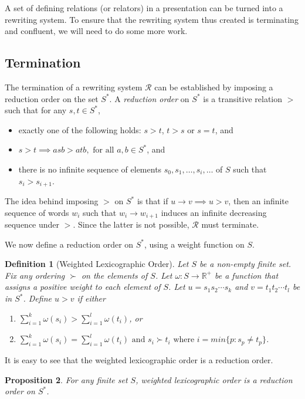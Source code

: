 \documentclass[12pt,a4paper]{amsart}
\newcommand{\rws}{\mathcal{R}}
\newcommand{\writesto}{\rightarrow}
\numberwithin{equation}{section}
\newtheorem{prop}{Proposition}[section]
\newtheorem{definition}[prop]{Definition}
\begin{document}
A set of defining relations (or relators) in a presentation can be turned into a rewriting system. To ensure that the rewriting system thus created is terminating and confluent, we will need to do some more work.

\subsection{Termination}

The termination of a rewriting system $\rws$ can be established by imposing a reduction order on the set $S^*$. A \emph{reduction order} on $S^*$ is a transitive relation $ > $ such that for any $s, t \in S^*$, 
\begin{itemize}
\item exactly one of the following holds: $s > t$, $t > s$ or $s=t$, and
\item $s > t \implies asb > atb, \text{ for all } a, b \in S^*$, and
\item there is no infinite sequence of elements $s_0, s_1, \dots, s_i, \dots$ of $S$ such that
$s_i > s_{i+1}$. 
\end{itemize}

The idea behind imposing $>$ on $S^*$ is that if $u \writesto v \implies u > v$, then an infinite sequence of words $w_i$ such that $w_i \writesto w_{i+1}$ induces an infinite decreasing sequence under $>$. Since the latter is not possible, $\rws$ must terminate.

We now define a reduction order on $S^*$, using a weight function on $S$.

\begin{definition}[Weighted Lexicographic Order]
Let $S$ be a non-empty finite set. Fix any ordering $\succ$ on the elements of $S$. Let $\omega : S \rightarrow \mathbb{R}^+$ be a function that assigns a positive weight to each element of $S$. Let $u=s_1s_2\cdots s_k$ and $v=t_1t_2\cdots t_l$ be in $S^*$. Define $u > v$ if either
\begin{enumerate}
	\item $\sum_{i=1}^k{\omega(s_i)} > \sum_{i=1}^{l}{\omega(t_i)}$, or
	\item $\sum_{i=1}^k{\omega(s_i)} =\sum_{i=1}^{l}{\omega(t_i)} \mbox{ and } s_i \succ t_i \mbox{ where } i=min\{p : s_p \neq t_p\}$.
\end{enumerate}
\end{definition}

It is easy to see that the weighted lexicographic order is a reduction order. 
\begin{prop}
For any finite set $S$, weighted lexicographic order is a reduction order on $S^*$.
\end{prop}
\end{document}
